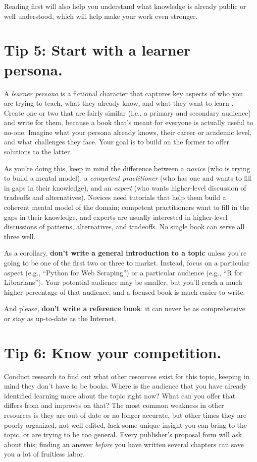 \documentclass[10pt,letterpaper]{article}
\begin{document}
Reading first will also help you understand what knowledge is already public or well understood,
which will help make your work even stronger. 

\section*{Tip 5: Start with a learner persona.}

A \emph{learner persona} is a fictional character that captures key aspects of
who you are trying to teach,
what they already know,
and what they want to learn \cite{Wi2019}.
Create one or two that are fairly similar (i.e., a primary and secondary audience) and write for them,
because a book that's meant for everyone is actually useful to no-one.
Imagine what your persona already knows,
their career or academic level,
and what challenges they face.
Your goal is to build on the former to offer solutions to the latter. 

As you're doing this,
keep in mind the difference between a \emph{novice} (who is trying to build a mental model),
a \emph{competent practitioner} (who has one and wants to fill in gaps in their knowledge),
and an \emph{expert} (who wants higher-level discussion of tradeoffs and alternatives).
Novices need tutorials that help them build a coherent mental model of the domain;
competent practitioners want to fill in the gaps in their knowledge,
and experts are usually interested in higher-level discussions of patterns, alternatives, and tradeoffs.
No single book can serve all three well.

As a corollary,
\textbf{don't write a general introduction to a topic}
unless you're going to be one of the first two or three to market.
Instead,
focus on a particular aspect (e.g., ``Python for Web Scraping'')
or a particular audience (e.g., ``R for Librarians'').
Your potential audience may be smaller,
but you'll reach a much higher percentage of that audience,
and a focused book is much easier to write.

And please, \textbf{don't write a reference book}:
it can never be as comprehensive or stay as up-to-date as the Internet.

\section*{Tip 6: Know your competition.}

Conduct research to find out what other resources exist for this topic,
keeping in mind they don't have to be books.
Where is the audience that you have already identified learning more about the topic right now?
What can you offer that differs from and improves on that?
The most common weakness in other resources is they are out of date or no longer accurate,
but other times they are poorly organized,
not well edited,
lack some unique insight you can bring to the topic,
or are trying to be too general.
Every publisher's proposal form will ask about this;
finding an answer \emph{before} you have written several chapters
can save you a lot of fruitless labor.
\end{document}
